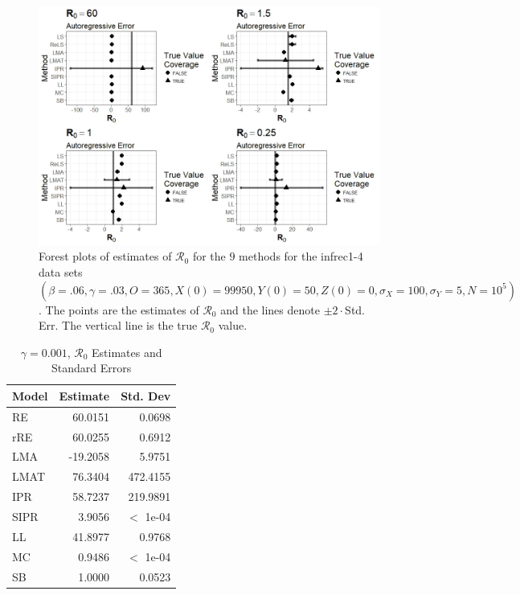 \documentclass[12pt]{article}
\newcommand{\xxsir}{\ensuremath{9} } %
\newcommand{\rr}{\ensuremath{\mathcal{R}_0}}
\begin{document}
\begin{figure}[H]
	\centering
	\includegraphics[scale=0.5]{images/parchange_ar.jpeg}
	\caption{Forest plots of estimates of $\rr$ for the \xxsir methods for the infrec1-4 data sets $(\beta=.06, \gamma=.03, O=365, X(0)=99950, Y(0)=50, Z(0)=0, \sigma_X=100, \sigma_Y=5, N=10^5)$.  The points are the estimates of $\rr$ and the lines denote $\pm 2\cdot $Std. Err.  The vertical line is the true $\rr$ value.}
\end{figure}
\begin{table}[H]
	
	\centering
	\begin{tabular}[t]{l|r|r}
		\hline
		Model & Estimate & Std. Dev\\
		\hline
		RE & 60.0151 & 0.0698\\
		\hline
		rRE & 60.0255 & 0.6912\\
		\hline
		LMA & -19.2058 & 5.9751\\
		\hline
		LMAT & 76.3404 & 472.4155\\
		\hline
		IPR & 58.7237 & 219.9891\\
		\hline
		SIPR & 3.9056 & $<$ 1e-04\\
		\hline
		LL & 41.8977 & 0.9768\\
		\hline
		MC & 0.9486 & $<$ 1e-04\\
		\hline
		SB & 1.0000 & 0.0523\\
		\hline
	\end{tabular}
	\caption{$\gamma = 0.001$, $\rr$ Estimates and Standard Errors}
\end{table}
\end{document}
